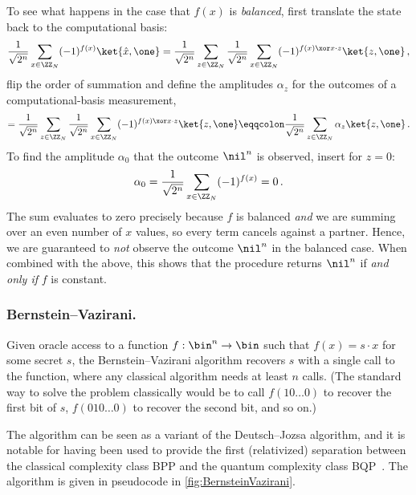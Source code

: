     To see what happens in the case that $f(x)$ is \emph{balanced}, first
      translate the state back to the computational basis:
      \[
        \frac{1}{\sqrt{2^n}} \sum_{x \in \ZZ_{N}} 
          (-1)^{f(x)} \ket{\hat x, \one}
        = \frac{1}{\sqrt{2^n}} 
          \sum_{z \in \ZZ_{N}} 
          \frac{1}{\sqrt{2^n}} 
          \sum_{x \in \ZZ_{N}}
          (-1)^{f(x) \xor x \cdot z} \ket{z, \one}\, ,
      \]
      flip the order of summation and define the amplitudes $\alpha_z$ for the 
      outcomes of a computational-basis measurement,
      \[
        = \frac{1}{\sqrt{2^n}} 
          \sum_{z \in \ZZ_{N}} 
          \frac{1}{\sqrt{2^n}} 
          \sum_{x \in \ZZ_{N}}
          (-1)^{f(x) \xor x \cdot z} \ket{z, \one}
        \eqqcolon \frac{1}{\sqrt{2^n}} 
          \sum_{z \in \ZZ_{N}} 
          \alpha_z \ket{z, \one}\, .
      \]
      To find the amplitude $\alpha_0$ that the outcome $\nil^n$
      is observed, insert for $z = 0$:
      \[
        \alpha_0 = \frac{1}{\sqrt{2^n}} 
          \sum_{x \in \ZZ_{N}} (-1)^{f(x)} = 0\, .
      \]
      The sum evaluates to zero precisely because $f$ is balanced \emph{and} we
      are summing over an even number of $x$ values, so every term cancels
      against a partner.
      Hence, we are guaranteed to \emph{not} observe the
      outcome $\nil^n$ in the balanced case. When combined with the
      above, this shows that the procedure returns $\nil^n$
      if \emph{and only if} $f$ is constant.

    \subsubsection{Bernstein--Vazirani.}
      Given oracle access to a function $f: \bin^n \to \bin$ such that 
        $f(x) = s \cdot x$ for some secret $s$, 
        the Bernstein--Vazirani algorithm recovers $s$ with a single call to
        the function, where any classical algorithm needs at least $n$ calls. (The
        standard way to solve the problem classically would be to call 
        $f(10 \ldots 0)$ to recover the first bit of $s$, $f(010 \ldots 0)$ to recover
        the second bit, and so on.) 

      The algorithm can be seen as a variant of the
        Deutsch--Jozsa algorithm, and it is notable for having been used to provide the
        first (relativized) separation between the classical complexity class BPP
        and the quantum complexity class BQP~\cite{BerVaz97}.
        The algorithm is given in pseudocode in \cref{fig:BernsteinVazirani}.

